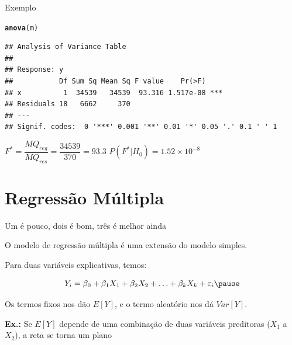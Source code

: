 \documentclass{beamer}\usepackage[]{graphicx}\usepackage[]{color}
\makeatletter
\newcommand{\hlstd}[1]{\textcolor[rgb]{0.345,0.345,0.345}{#1}}%
\newcommand{\hlkwd}[1]{\textcolor[rgb]{0.737,0.353,0.396}{\textbf{#1}}}%
\newenvironment{kframe}{%
 \def\at@end@of@kframe{}%
 \ifinner\ifhmode%
  \def\at@end@of@kframe{\end{minipage}}%
  \begin{minipage}{\columnwidth}%
 \fi\fi%
 \def\FrameCommand##1{\hskip\@totalleftmargin \hskip-\fboxsep
 \colorbox{shadecolor}{##1}\hskip-\fboxsep
     \hskip-\linewidth \hskip-\@totalleftmargin \hskip\columnwidth}%
 \MakeFramed {\advance\hsize-\width
   \@totalleftmargin\z@ \linewidth\hsize
   \@setminipage}}%
 {\par\unskip\endMakeFramed%
 \at@end@of@kframe}
\newenvironment{knitrout}{}{} %
\renewenvironment{knitrout}{\setlength{\topsep}{0mm}}{}
\makeatother
\begin{document}
\begin{frame}[fragile]{Exemplo}

\begin{knitrout}\tiny
{}\color{fgcolor}\begin{kframe}
\begin{alltt}
\hlkwd{anova}\hlstd{(m)}
\end{alltt}
\begin{verbatim}
## Analysis of Variance Table
## 
## Response: y
##           Df Sum Sq Mean Sq F value    Pr(>F)    
## x          1  34539   34539  93.316 1.517e-08 ***
## Residuals 18   6662     370                      
## ---
## Signif. codes:  0 '***' 0.001 '**' 0.01 '*' 0.05 '.' 0.1 ' ' 1
\end{verbatim}
\end{kframe}
\end{knitrout}
\bigskip
$F^* = \dfrac{MQ_{reg}}{MQ_{res}} = \dfrac{34539}{370} = 93.3$ \pause
\vfill
$P(F^*|H_0) = 1.52 \times 10^{-8}$

\end{frame}

\section{Regressão Múltipla}

\begin{frame}{Um é pouco, dois é bom, três é melhor ainda}

O modelo de regressão múltipla é uma extensão do modelo simples. 

\vfill

Para duas variáveis explicativas, temos: \pause

\begin{equation*}
Y_i = \beta _0 + \beta _1 X_1 + \beta _2 X_2 + \ldots + \beta _k X_k + \varepsilon _i \pause
\end{equation*}

Os termos fixos nos dão $E[Y]$, e o termo aleatório nos dá $Var[Y]$. \pause

\vfill

\alert{\textbf{Ex.:}} Se $E[Y]$ depende de uma combinação de duas variáveis preditoras ($X_1$ a $X_2$), a reta se torna um plano 

\vfill


\end{frame}
\end{document}

